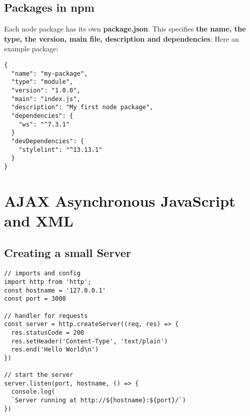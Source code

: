 \documentclass[main.tex,fontsize=6pt,paper=a4,paper=landscape,DIV=calc,]{scrartcl}
\begin{document}
\begin{multicols*}{4}
\subsection{Packages in npm}  
Each node package has its own \textbf{package.json}.\newline
This specifies \textbf{the name, the type, the version, main file, description and dependencies}:\newline
Here an example package:\newline
\vspace{-2mm}
\begin{lstlisting}
{
  "name": "my-package",
  "type": "module",
  "version": "1.0.0",
  "main": "index.js",
  "description": "My first node package",
  "dependencies": {
    "ws": "^7.3.1"
  }
  "devDependencies": {
    "stylelint": "^13.13.1"
  }
}
\end{lstlisting}
\vspace{2mm}

\section{AJAX Asynchronous JavaScript and XML}

\subsection{Creating a small Server}  
\vspace{-2mm}
\begin{lstlisting}
// imports and config
import http from 'http';
const hostname = '127.0.0.1'
const port = 3000

// handler for requests
const server = http.createServer((req, res) => {
  res.statusCode = 200
  res.setHeader('Content-Type', 'text/plain')
  res.end('Hello World\n')
})

// start the server
server.listen(port, hostname, () => {
  console.log(
  `Server running at http://${hostname}:${port}/`)
})
\end{lstlisting}
\vspace{2mm}


\end{multicols*}
\end{document}

